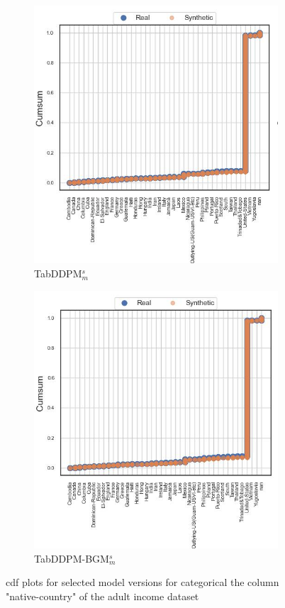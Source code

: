 \begin{figure}[H]
	\begin{subfigure}{0.32\textwidth}
		\centering
		\includegraphics[width=\textwidth]{images/cdf/tab-ddpm-simTune-minmax.jpg}
		\caption{TabDDPM$^{s}_m$}
	\end{subfigure}
	\begin{subfigure}{0.32\textwidth}
		\centering
		\includegraphics[width=\textwidth]{images/cdf/tab-ddpm-bgm-simTune-minmax.jpg}
		\caption{TabDDPM-BGM$^{s}_m$}
	\end{subfigure}
	\caption[CDF native-country]{\gls{cdf} plots for selected model versions for categorical the column "native-country" of the adult income dataset \cite{Dua:2019}}
	\label{fig:cdf}
\end{figure}


